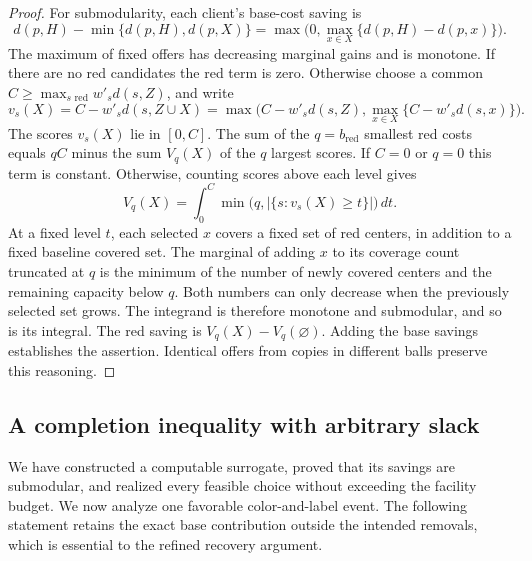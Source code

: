 \begin{proof}
For submodularity, each client's base-cost saving is
\[
 d(p,H)-\min\{d(p,H),d(p,X)\}
 =\max\bigl(0,\max_{x\in X}\{d(p,H)-d(p,x)\}\bigr).
\]
The maximum of fixed offers has decreasing marginal gains and is
monotone.  If there are no red candidates the red term is zero.
Otherwise choose a common
$C\ge\max_{s\text{ red}}w'_sd(s,Z)$, and write
\[
 v_s(X)=C-w'_sd(s,Z\cup X)
       =\max\bigl(C-w'_sd(s,Z),
                    \max_{x\in X}\{C-w'_sd(s,x)\}\bigr).
\]
The scores $v_s(X)$ lie in $[0,C]$.  The sum of the
$q=b_{\mathrm{red}}$ smallest red costs equals $qC$ minus the sum
$V_q(X)$ of the $q$ largest scores.  If $C=0$ or $q=0$ this term is
constant.  Otherwise, counting scores above each level gives
\[
 V_q(X)=\int_0^C\min\bigl(q,|\{s:v_s(X)\ge t\}|\bigr)\,dt.
\]
At a fixed level $t$, each selected $x$ covers a fixed set of red
centers, in addition to a fixed baseline covered set.  The marginal of
adding $x$ to its coverage count truncated at $q$ is the minimum of
the number of newly covered centers and the remaining capacity below
$q$.  Both numbers can only decrease when the previously selected set
grows.  The integrand is therefore monotone and submodular, and so is
its integral.  The red saving is $V_q(X)-V_q(\varnothing)$.
Adding the base savings establishes the assertion.  Identical offers
from copies in different balls preserve this reasoning.
\end{proof}

\subsection{A completion inequality with arbitrary slack}

We have constructed a computable surrogate, proved that its savings
are submodular, and realized every feasible choice without exceeding
the facility budget.  We now analyze one favorable color-and-label
event.  The following statement retains the exact base contribution
outside the intended removals, which is essential to the refined
recovery argument.

